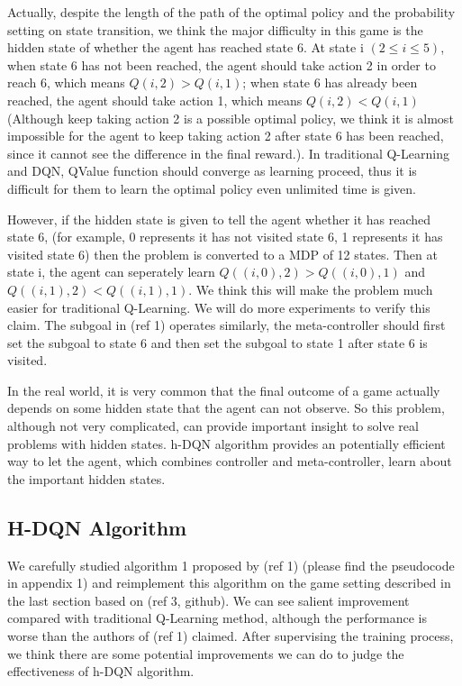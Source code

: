 \documentclass{article}
\begin{document}
\begin{spacing}{1.1}
    Actually, despite the length of the path of the optimal policy and the probability setting on state transition, we think the major difficulty in this game is the hidden state of whether the agent has reached state 6. At state i $(2\leq i\leq 5)$, when state 6 has not been reached, the agent should take action 2 in order to reach 6, which means $Q(i, 2) > Q(i, 1)$; when state 6 has already been reached, the agent should take action 1, which means $Q(i, 2) < Q(i, 1)$ (Although keep taking action 2 is a possible optimal policy, we think it is almost impossible for the agent to keep taking action 2 after state 6 has been reached, since it cannot see the difference in the final reward.). In traditional Q-Learning and DQN, QValue function should converge as learning proceed, thus it is difficult for them to learn the optimal policy even unlimited time is given. 
    
    However, if the hidden state is given to tell the agent whether it has reached state 6, (for example, 0 represents it has not visited state 6, 1 represents it has visited state 6) then the problem is converted to a MDP of 12 states. Then at state i, the agent can seperately learn $Q((i, 0), 2) > Q((i, 0), 1)$ and $Q((i, 1), 2) < Q((i, 1), 1)$. We think this will make the problem much easier for traditional Q-Learning. We will do more experiments to verify this claim. The subgoal in (ref 1) operates similarly, the meta-controller should first set the subgoal to state 6 and then set the subgoal to state 1 after state 6 is visited.

    In the real world, it is very common that the final outcome of a game actually depends on some hidden state that the agent can not observe. So this problem, although not very complicated, can provide important insight to solve real problems with hidden states. h-DQN algorithm provides an potentially efficient way to let the agent, which combines controller and meta-controller, learn about the important hidden states.
    \subsection*{H-DQN Algorithm}
    We carefully studied algorithm 1 proposed by (ref 1) (please find the pseudocode in appendix 1) and reimplement this algorithm on the game setting described in the last section based on (ref 3, github). We can see salient improvement compared with traditional Q-Learning method, although the performance is worse than the authors of (ref 1) claimed. After supervising the training process, we think there are some potential improvements we can do to judge the effectiveness of h-DQN algorithm.


\end{spacing}
\end{document}
